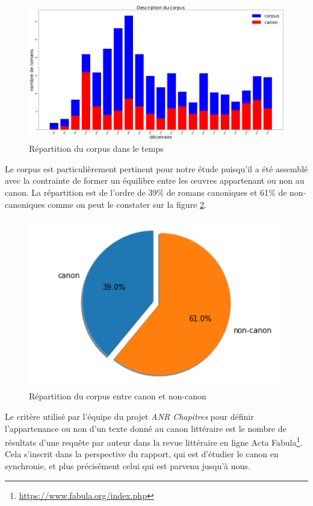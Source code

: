 \documentclass[a4paper,twoside,12pt]{book}
\begin{document}
\begin{figure}[!ht]
    \centering
    \includegraphics[width=12cm]{img/01_desc_corpus.png}
    \caption{Répartition du corpus dans le temps}
    \label{corpus_bar}
\end{figure}

Le corpus est particulièrement pertinent pour notre étude puisqu'il a été assemblé avec la contrainte de former un équilibre entre les œuvres appartenant ou non au canon. La répartition est de l'ordre de 39\% de romans canoniques et 61\% de non-canoniques comme on peut le constater sur la figure \ref{corpus_bert}.

\begin{figure}[!ht]
    \centering
    \includegraphics[width=12cm]{img/02_desc_corpus.png}
    \caption{Répartition du corpus entre canon et non-canon}
    \label{corpus_bert}
\end{figure}
\newpage
Le critère utilisé par l'équipe du projet \textit{ANR Chapitres} pour définir l'appartenance ou non d'un texte donné au canon littéraire est le nombre de résultats d'une requête par auteur dans la revue littéraire en ligne Acta Fabula\footnote{\url{https://www.fabula.org/index.php}}. Cela s'inscrit dans la perspective du rapport, qui est d'étudier le canon en synchronie, et plus précisément celui qui est parvenu jusqu'à nous.
\end{document}
